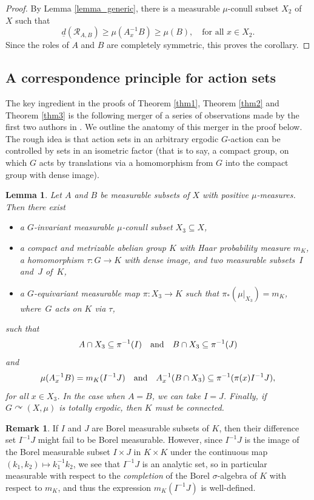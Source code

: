\documentclass[10pt]{amsart}
\let\mathcal\mathscr
\newcommand{\cR}{\mathcal{R}}
\newcommand{\qand}{\quad\textup{and}\quad}
\let\acts\curvearrowright
\theoremstyle{plain}
\newtheorem{lemma}[theorem]{Lemma}
\theoremstyle{definition}
\newtheorem{remark}[theorem]{Remark}
\begin{document}
\begin{proof}
By Lemma \ref{lemma_generic}, there is a measurable $\mu$-conull subset $X_2$ of $X$ such that
\[
\underline{d}(\cR_{A,B}) \geq \mu(A_x^{-1}B) \geq \mu(B), \quad \textrm{for all $x \in X_2$}.
\]
Since the roles of $A$ and $B$ are completely symmetric, this proves the corollary.
\end{proof}

\subsection{A correspondence principle for action sets}

The key ingredient in the proofs of Theorem \ref{thm1}, Theorem \ref{thm2} and Theorem \ref{thm3} is the following merger of a series of
observations made by the first two authors in \cite{BF}. We outline the anatomy of this merger in the proof below. The rough idea is that
action sets in an arbitrary ergodic $G$-action can be controlled by sets in an isometric factor (that is to say, a compact group, on which $G$
acts by translations via a homomorphism from $G$ into the compact group with dense image).

\begin{lemma}
\label{corrprinciple}
Let $A$ and $B$ be measurable subsets of $X$ with positive $\mu$-measures. Then there exist

\begin{itemize}
\item a $G$-invariant measurable $\mu$-conull subset $X_3 \subseteq X$,
\item a compact and metrizable abelian group $K$ with Haar probability measure $m_K$, a homomorphism $\tau : G \to K$ with dense image,
and two measurable subsets~$I$ and~$J$ of~$K$,
\item a $G$-equivariant measurable map $\pi : X_3 \to K$ such that $\pi_*(\mu |_{X_3}) = m_K$, where~$G$ acts on $K$ via $\tau$,
\end{itemize}
such that
\[
A \cap X_3 \subseteq \pi^{-1}(I) \qand B \cap X_3 \subseteq \pi^{-1}(J)
\]
and
\[
\mu(A_x^{-1}B) = m_K(I^{-1}J)
\qand
A_x^{-1}(B \cap X_3) \subseteq \pi^{-1}(\pi(x) I^{-1}J),
\]
for all $x \in X_3$. In the case when $A = B$, we can take $I = J$. Finally, if $G \acts (X,\mu)$ is totally ergodic, then $K$ must be connected.
\end{lemma}

\begin{remark}
If $I$ and $J$ are Borel measurable subsets of $K$, then their difference set $I^{-1}J$ might fail to be Borel measurable. However, since
$I^{-1}J$ is the image of the Borel measurable subset $I \times J$ in $K \times K$ under the continuous map $(k_1,k_2) \mapsto k_1^{-1}k_2$,
we see that $I^{-1}J$ is an analytic set, so in particular measurable with respect to the \emph{completion} of the Borel $\sigma$-algebra of $K$ with
respect to $m_K$, and thus the expression $m_K(I^{-1}J)$ is well-defined.
\end{remark}
\end{document}
